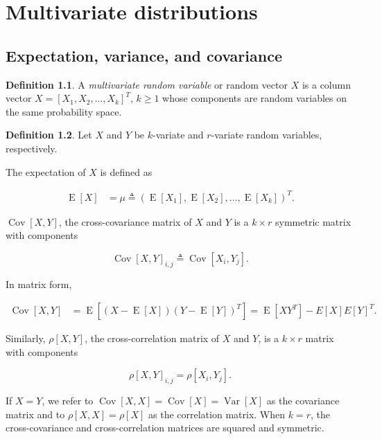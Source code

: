 \documentclass{book}
\theoremstyle{plain}%
\theoremstyle{definition}
\newtheorem{definition}{Definition}[section]
\DeclareMathOperator{\Var}{Var}
\DeclareMathOperator{\Cov}{Cov}
\DeclareMathOperator{\E}{E}
\begin{document}
\chapter{Multivariate distributions}

\section{Expectation, variance, and covariance}

\begin{definition}
A \textit{multivariate random variable} or random vector $X$ is a column vector $X = [X_1,X_2,...,X_k]^T$, $k \geq 1$ whose components are random variables on the same probability space.
\end{definition}

\begin{definition} Let $X$ and $Y$ be $k$-variate and $r$-variate random variables, respectively.

The expectation of $X$ is defined as

\begin{align*}
\E[X] &= \mu \triangleq (\E[X_1], \E[X_2],...,\E[X_k])^T.
\end{align*}

$\Cov[X,Y]$, the cross-covariance matrix of $X$ and $Y$ is a $k \times r$ symmetric matrix with components

$$\Cov[X,Y]_{i,j} \triangleq \Cov[X_i, Y_j].$$

In matrix form,

\begin{align*}
\Cov[X,Y] &= \E[(X - \E[X])(Y - \E[Y])^T] = \E[XY^T] - E[X]E[Y]^T.
\end{align*}

Similarly, $\rho[X,Y]$, the cross-correlation matrix of $X$ and $Y$, is a $k \times r$ matrix with components

$$\rho[X,Y]_{i,j} = \rho[X_i, Y_j].$$

If $X = Y$, we refer to $\Cov[X,X] = \Cov[X] = \Var[X]$ as the covariance matrix and to $\rho[X,X] = \rho[X]$ as the correlation matrix. When $k = r$, the cross-covariance and cross-correlation matrices are squared and symmetric.
\end{definition}
\end{document}
